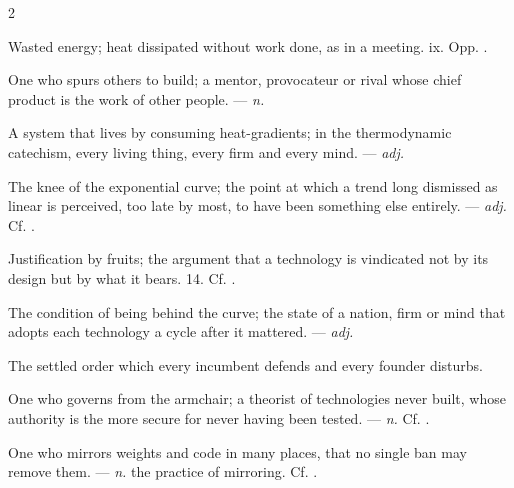 \begin{multicols}{2}

 Wasted energy; heat dissipated without work done, as in a meeting.   ix. Opp. .

 One who spurs others to build; a mentor, provocateur or rival whose chief product is the work of other people.  —  \textit{n.}

 A system that lives by consuming heat-gradients; in the thermodynamic catechism, every living thing, every firm and every mind.   —  \textit{adj.}

 The knee of the exponential curve; the point at which a trend long dismissed as linear is perceived, too late by most, to have been something else entirely.   —  \textit{adj.} Cf. .

 Justification by fruits; the argument that a technology is vindicated not by its design but by what it bears.   14. Cf. .

 The condition of being behind the curve; the state of a nation, firm or mind that adopts each technology a cycle after it mattered. —  \textit{adj.}

  The settled order which every incumbent defends and every founder disturbs.

 One who governs from the armchair; a theorist of technologies never built, whose authority is the more secure for never having been tested. —  \textit{n.} Cf. .

 One who mirrors weights and code in many places, that no single ban may remove them. —  \textit{n.} the practice of mirroring. Cf. .


\end{multicols}
